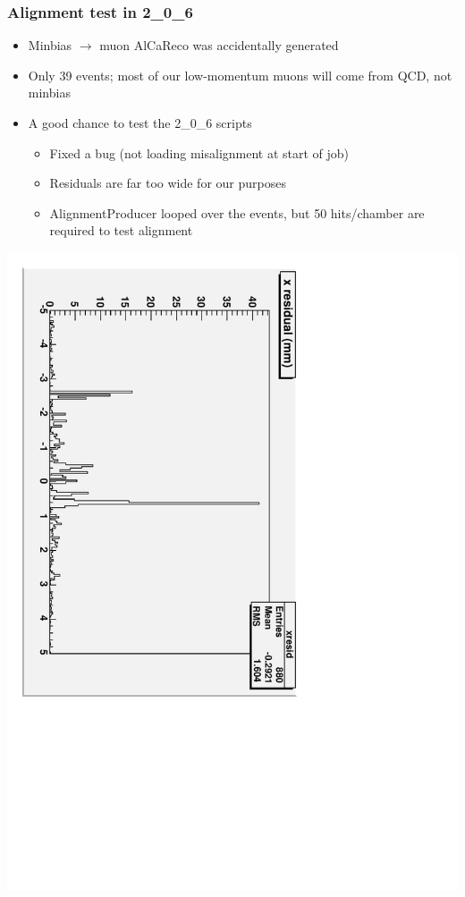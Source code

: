 \documentclass[compress]{beamer}
\begin{document}
\begin{frame}
\frametitle{Alignment test in 2\_0\_6}

\begin{itemize}\setlength{\itemsep}{0.1 cm}
\item Minbias $\to$ muon AlCaReco was accidentally generated
\item Only 39 events; most of our low-momentum muons will come from QCD, not minbias
\item A good chance to test the 2\_0\_6 scripts
\begin{itemize}\setlength{\itemsep}{0.1 cm}
\item Fixed a bug (not loading misalignment at start of job)
\item Residuals are far too wide for our purposes
\item AlignmentProducer looped over the events, but 50 hits/chamber
are required to test alignment
\end{itemize}
\end{itemize}

\begin{center}
\includegraphics[height=0.6\linewidth, angle=90]{minbias_residuals.pdf}
\end{center}

\end{frame}


\end{document}
